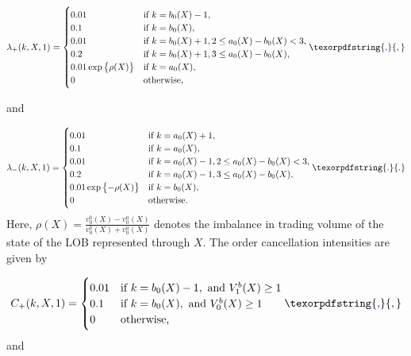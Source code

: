 \documentclass[10pt,a4paper,oneside]{article}
\providecommand{\DIFaddtex}[1]{{\protect\color{blue} \sf #1}} %
\providecommand{\DIFaddbegin}{} %
\providecommand{\DIFaddend}{} %
\providecommand{\DIFdelbegin}{} %
\providecommand{\DIFdelend}{} %
\providecommand{\DIFadd}[1]{\texorpdfstring{\DIFaddtex{#1}}{#1}} %
\newcommand{\DIFscaledelfig}{0.5}
\newlength{\DIFdelgraphicswidth} %
\newlength{\DIFdelgraphicsheight} %
\newcommand{\DIFaddincludegraphics}[2][]{{\color{blue}\fbox{\DIFOincludegraphics[#1]{#2}}}} %
\newcommand{\DIFdelincludegraphics}[2][]{%
\sbox{\DIFdelgraphicsbox}{\DIFOincludegraphics[#1]{#2}}%
\settoboxwidth{\DIFdelgraphicswidth}{\DIFdelgraphicsbox} %
\settoboxtotalheight{\DIFdelgraphicsheight}{\DIFdelgraphicsbox} %
\scalebox{\DIFscaledelfig}{%
\parbox[b]{\DIFdelgraphicswidth}{\usebox{\DIFdelgraphicsbox}\\[-\baselineskip] \rule{\DIFdelgraphicswidth}{0em}}\llap{\resizebox{\DIFdelgraphicswidth}{\DIFdelgraphicsheight}{%
\setlength{\unitlength}{\DIFdelgraphicswidth}%
\begin{picture}(1,1)%
\thicklines\linethickness{2pt} %
{\color[rgb]{1,0,0}\put(0,0){\framebox(1,1){}}}%
{\color[rgb]{1,0,0}\put(0,0){\line( 1,1){1}}}%
{\color[rgb]{1,0,0}\put(0,1){\line(1,-1){1}}}%
\end{picture}%
}\hspace*{3pt}}} %
} %
\DeclareRobustCommand{\DIFaddbegin}{\DIFOaddbegin \let\includegraphics\DIFaddincludegraphics} %
\DeclareRobustCommand{\DIFaddend}{\DIFOaddend \let\includegraphics\DIFOincludegraphics} %
\DeclareRobustCommand{\DIFdelbegin}{\DIFOdelbegin \let\includegraphics\DIFdelincludegraphics} %
\DeclareRobustCommand{\DIFdelend}{\DIFOaddend \let\includegraphics\DIFOincludegraphics} %
\begin{document}
\[
    \lambda_+(k, X, 1) =
    \begin{cases}
        0.01                               & \text{if } k = b_0(X) - 1,                             \\
        0.1                                & \text{if } k = b_0(X),                                 \\
        0.01                               & \text{if } k = b_0(X) + 1, 2 \leq a_0(X) - b_0(X) < 3, \\
        0.2                                & \text{if } k = b_0(X) + 1, 3 \leq a_0(X) - b_0(X),     \\
        0.01 \exp \left\{ \rho(X) \right\} & \text{if } k = a_0(X),                                 \\
        0                                  & \text{otherwise,}
    \end{cases}\DIFaddbegin \DIFadd{,
}\DIFaddend \]

and

\[
    \lambda_-(k, X, 1) =
    \begin{cases}
        0.01                                 & \text{if } k = a_0(X) + 1,                             \\
        0.1                                  & \text{if } k = a_0(X),                                 \\
        0.01                                 & \text{if } k = a_0(X) - 1, 2 \leq a_0(X) - b_0(X) < 3, \\
        0.2                                  & \text{if } k = a_0(X) - 1, 3 \leq a_0(X) - b_0(X),     \\
        0.01 \exp \left\{ - \rho(X) \right\} & \text{if } k = b_0(X),                                 \\
        0                                    & \text{otherwise.}
    \end{cases}\DIFaddbegin \DIFadd{.
}\DIFaddend \]
Here, $\rho(X) = \frac{v^b_0(X) - v^a_0(X)}{v^b_0(X) + v^a_0(X)}$ denotes the imbalance in trading volume of the state of the LOB represented through $X$. The order cancellation intensities are given by

\[
    C_+(k, X, 1) =
    \DIFdelbegin %
\DIFdelend \DIFaddbegin \begin{cases}
        0.01 & \text{if } k = b_0(X) - 1, \text{ and } V^b_1(X) \geq 1 \\
        0.1  & \text{if } k = b_0(X), \text{ and } V^b_0(X) \geq 1     \\
        0    & \text{otherwise,}
    \end{cases}\DIFaddend \DIFaddbegin \DIFadd{,
}\DIFaddend \]
and
\end{document}
